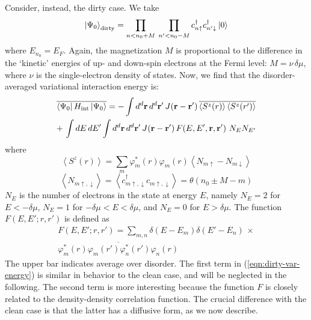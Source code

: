 \documentclass[prb,twocolumn]{revtex4}
\begin{document}
Consider, instead, the dirty case. We take
\begin{equation}
\left|{\Psi_0}\right\rangle_{\rm dirty} =
\prod_{n<{n_0}+M}\: \prod_{n'<{n_0}-M}
{c^\dagger_{n\uparrow}}{c^\dagger_{n'\downarrow}}
\left|0\right\rangle
\end{equation}
where $E_{n_0}={E_F}$. Again, the magnetization $M$ is proportional
to the difference in the `kinetic' energies of up- and down-spin electrons at
the Fermi level: $M=\nu \,\delta\mu$, where $\nu$ is the single-electron
density of states. Now, we find that the disorder-averaged variational
interaction energy is:
\begin{multline}
\label{eqn:dirty-var-energy}
\overline{\left\langle{\Psi_0}\right| H_{\rm int} \left|{\Psi_0}\right\rangle} =
-\int {d^d}{\bf r}\,{d^d}{\bf r'}\, J\!\left({\bf r}-{\bf r'}\right) 
\overline{\left\langle{S^z}(r)\right\rangle \left\langle{S^z}(r')\right\rangle}\\
+\, \int dE\,dE'\int {d^d}{\bf r}\,{d^d}{\bf r'}\, J\!\left({\bf r}-{\bf r'}\right)
F\!\left(E,E',{\bf r},{\bf r'}\right)\,{N_E}N_{E'}
\end{multline}
where
\begin{equation}
\left\langle{S^z}(r)\right\rangle =
{\sum_{m}} \varphi^{*}_{m}(r)\varphi_{m}(r) \left\langle N_{m\uparrow}-N_{m\downarrow}\right\rangle
\end{equation}
\begin{equation}
\left\langle N_{m\uparrow,\downarrow}\right\rangle = \left\langle {c^\dagger_{m\uparrow,\downarrow}}{c^{}_{m\uparrow,\downarrow}}\right\rangle
=\theta({n_0}\pm M-m)
\end{equation}
$N_E$ is the number of electrons in the state at
energy $E$, namely ${N_E}=2$ for $E<-\delta\!\mu$,
${N_E}=1$ for $-\delta\!\mu<E<\delta\!\mu$, and 
${N_E}=0$ for $E>\delta\!\mu$.
The function $F(E,E';r,r')$ is defined as
\begin{multline}
F(E,E';r,r')=\sum_{m,n}\delta(E-E_m)\delta(E'-E_n)\, \times\\
\overline{\varphi^{*}_{m}(r)\varphi_{m}(r')\varphi^{*}_{n}(r')\varphi_{n}(r)}\:
\end{multline}
The upper bar indicates average over disorder.
The first term in (\ref{eqn:dirty-var-energy}) is similar in behavior
to the clean case, and will be neglected in the following.
The second term is more interesting because
the function $F$ is closely related to the density-density
correlation function. 
The crucial difference with the clean case is that
the latter has a diffusive form, as we now describe.
\end{document}
